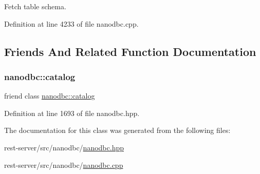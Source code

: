 Fetch table schema. 



Definition at line 4233 of file nanodbc.\+cpp.



\subsection{Friends And Related Function Documentation}
\mbox{\label{classnanodbc_1_1catalog_1_1table__privileges_af0f3134c7f6f1f36bfe1e247318dfe43}} 
\subsubsection{\texorpdfstring{nanodbc::catalog}{nanodbc::catalog}}
{\footnotesize\ttfamily friend class \mbox{\hyperlink{classnanodbc_1_1catalog}{nanodbc\+::catalog}}\hspace{0.3cm}{\ttfamily [friend]}}



Definition at line 1693 of file nanodbc.\+hpp.



The documentation for this class was generated from the following files\+:\begin{DoxyCompactItemize}
\item 
rest-\/server/src/nanodbc/\mbox{\hyperlink{nanodbc_8hpp}{nanodbc.\+hpp}}\item 
rest-\/server/src/nanodbc/\mbox{\hyperlink{nanodbc_8cpp}{nanodbc.\+cpp}}\end{DoxyCompactItemize}
